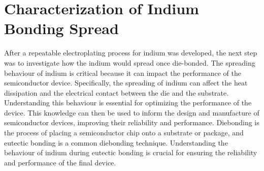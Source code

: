 \section{Characterization of Indium Bonding Spread}
\label{sec:indiumSpread}
After a repeatable electroplating process for indium was developed, the next step was to investigate how the indium would spread once die-bonded. The spreading behaviour of indium is critical because it can impact the performance of the semiconductor device. Specifically, the spreading of indium can affect the heat dissipation and the electrical contact between the die and the substrate. Understanding this behaviour is essential for optimizing the performance of the device.
This knowledge can then be used to inform the design and manufacture of semiconductor devices, improving their reliability and performance.
Diebonding is the process of placing a semiconductor chip onto a substrate or package, and eutectic bonding is a common diebonding technique. Understanding the behaviour of indium during eutectic bonding is crucial for ensuring the reliability and performance of the final device.

